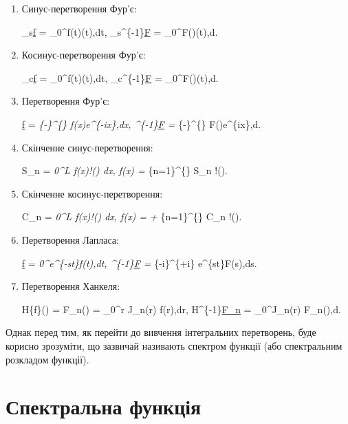 \documentclass[
  ukrainian,
]{article}
\begin{document}
\begin{enumerate}
\def\labelenumi{\arabic{enumi}.}
\item
  Синус-перетворення Фур'є:

  \_s\href{/omega}{f} =
  \int\_0\^{}\infty f(t)\sin(\omega t),dt,
  \_s\^{}\{-1\}\href{t}{F} =
  \int\_0\^{}\infty F(\omega)\sin(\omega t),d\omega.
\item
  Косинус-перетворення Фур'є:

  \_c\href{/omega}{f} =
  \int\_0\^{}\infty f(t)\cos(\omega t),dt,
  \_c\^{}\{-1\}\href{t}{F} =
  \int\_0\^{}\infty F(\omega)\cos(\omega t),d\omega.
\item
  Перетворення Фур'є:

  \href{/omega}{f} =
  \int\emph{\{-\infty\}\^{}\{\infty\}
  f(x)e\^{}\{-i\omega x\},dx, \^{}\{-1\}\href{x}{F} =
  \int}\{-\infty\}\^{}\{\infty\}
  F(\omega)e\^{}\{i\omega x\},d\omega.
\item
  Скінченне синус-перетворення:

  S\_n = \int\emph{0\^{}L
  f(x)\sin!\left(\right) dx, f(x) =
  \sum}\{n=1\}\^{}\{\infty\} S\_n \sin!\left(\right).
\item
  Скінченне косинус-перетворення:

  C\_n = \int\emph{0\^{}L
  f(x)\cos!\left(\right) dx, f(x) =  +
  \sum}\{n=1\}\^{}\{\infty\} C\_n \cos!\left(\right).
\item
  Перетворення Лапласа:

  \href{s}{f} = \int\emph{0\^{}\infty e\^{}\{-st\}f(t),dt,
  \^{}\{-1\}\href{t}{F} =
  \int}\{\gamma-i\infty\}\^{}\{\gamma+i\infty\}
  e\^{}\{st\}F(s),ds.
\item
  Перетворення Ханкеля:

  H\{f\}(\xi) = F\_n(\xi) = \int\_0\^{}\infty r J\_n(\xi r) f(r),dr,
  H\^{}\{-1\}\href{r}{F\_n} = \int\_0\^{}\infty \xi J\_n(\xi r)
  F\_n(\xi),d\xi.
\end{enumerate}

Однак перед тим, як перейти до вивчення інтегральних перетворень, буде
корисно зрозуміти, що зазвичай називають спектром функції (або
спектральним розкладом функції).

\section{Спектральна
функція}\label{ux441ux43fux435ux43aux442ux440ux430ux43bux44cux43dux430-ux444ux443ux43dux43aux446ux456ux44f}
\end{document}
